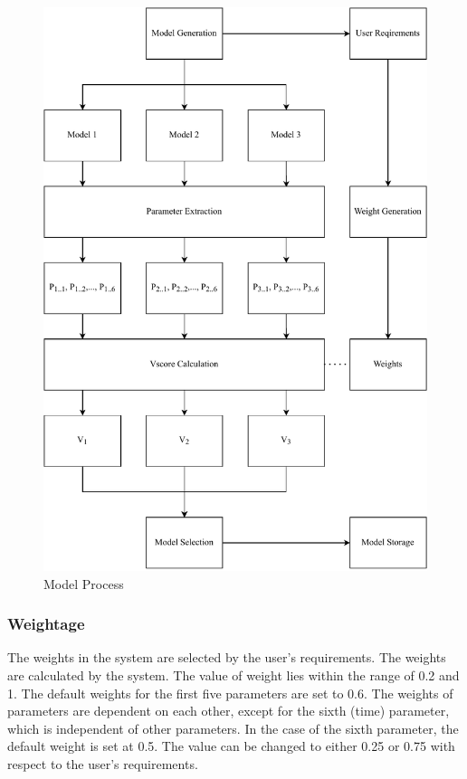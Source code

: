 \documentclass[a4paper,fleqn]{cas-dc}
\begin{document}
\begin{figure}[ht]
    \centering
    \includegraphics[width=1.6\columnwidth]{math_model_relaxed_flow.pdf}
    \caption{Model Process}
    \label{fig:model_process}
\end{figure}

\subsubsection*{Weightage}\label{subsubsec:weightage}

The weights in the system are selected by the user's requirements. The weights are calculated by the system. The value of weight lies within the range of 0.2 and 1. The default weights for the first five parameters are set to 0.6. The weights of parameters are dependent on each other, except for the sixth (time) parameter, which is independent of other parameters. In the case of the sixth parameter, the default weight is set at 0.5. The value can be changed to either 0.25 or 0.75 with respect to the user's requirements.
\end{document}
